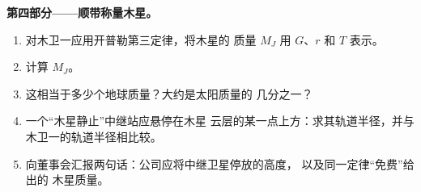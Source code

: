 \begin{problem}
\medskip
\noindent\textbf{第四部分——顺带称量木星。}
\begin{enumerate}[resume]
  \item 对木卫一应用开普勒第三定律，将木星的
        质量 $M_J$ 用 $G$、$r$ 和 $T$ 表示。
  \item 计算 $M_J$。
  \item 这相当于多少个地球质量？大约是太阳质量的
        几分之一？
  \item 一个“木星静止”中继站应悬停在木星
        云层的某一点上方：求其轨道半径，并与
        木卫一的轨道半径相比较。
  \item 向董事会汇报两句话：公司应将中继卫星停放的高度，
        以及同一定律“免费”给出的
        木星质量。
\end{enumerate}
\end{problem}
